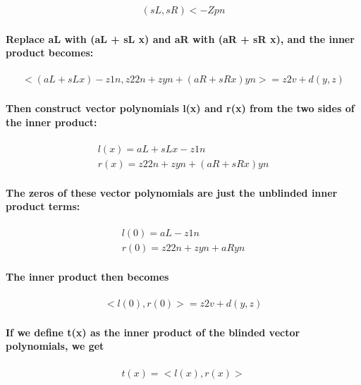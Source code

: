 \documentclass{article}
\begin{document}
\begin{eqnarray}
  (sL, sR) <- Zpn
\end{eqnarray}

\paragraph{Replace aL with (aL + sL x) and aR with (aR + sR x), and the inner product becomes:}

\begin{eqnarray}
  <(aL + sL x) - z 1n, z2 2n + z yn + (aR+ sR x)yn> = z2 v + d(y,z)
\end{eqnarray}

\paragraph{Then construct vector polynomials l(x) and r(x) from the two sides of the inner product:}

\begin{eqnarray}
  l(x) = aL + sL x - z 1n\\
  r(x) = z2 2n + z yn + (aR+ sR x)yn
\end{eqnarray}

\paragraph{The zeros of these vector polynomials are just the unblinded inner product terms:}

\begin{eqnarray}
  l(0) = aL - z 1n\\
  r(0) = z2 2n + z yn + aRyn
\end{eqnarray}

\paragraph{The inner product then becomes}

\begin{eqnarray}
  <l(0), r(0)> = z2 v + d(y,z)
\end{eqnarray}

\paragraph{If we define t(x) as the inner product of the blinded vector polynomials, we get}

\begin{eqnarray}
  t(x) = <l(x), r(x)> 
\end{eqnarray}
\end{document}
